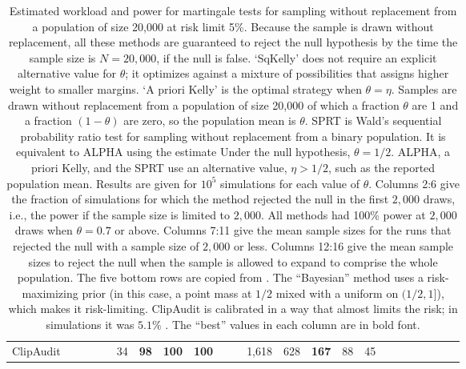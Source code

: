\documentclass[12pt,runningheads]{llncs}
\begin{document}
{\begin{table}
\begin{tabular}{llr|rrrrrr|rrrrrrr|rrrrrrr}
ClipAudit &  & &&& 34 & \bf{98} & \bf{100} &\bf{100}&&& 1,618 & 628 & \bf{167} & 88 & 45 
\end{tabular} 
\caption{\protect \label{tab:finite-population}
Estimated workload and power for martingale tests for sampling without replacement from a population of size 20,000 at
risk limit 5\%.
Because the sample is drawn without replacement, all these methods are guaranteed to reject the null hypothesis by the time
the sample size is $N=20,000$, if the null is false.
`SqKelly' does not require an explicit alternative value for $\theta$; it optimizes against a mixture of possibilities that assigns higher weight
to smaller margins.
`A priori Kelly' is the optimal strategy when $\theta = \eta$.
Samples are drawn without replacement from a population of size 20,000 of which a fraction $\theta$ are 1 and a fraction $(1-\theta)$
are zero, so the population mean is $\theta$.
SPRT is Wald's sequential probability ratio test for sampling without replacement from a binary population. 
It is equivalent to ALPHA using the estimate 
Under the null hypothesis, $\theta=1/2$. 
ALPHA, a priori Kelly, and the SPRT use an alternative value, $\eta > 1/2$, such as the reported population mean. 
Results are given for $10^5$ simulations for each value of $\theta$.
Columns 2:6 give the fraction of simulations for which the method rejected the null in the first $2,000$ draws, i.e., the power if the sample size is limited to $2,000$.
All methods had 100\% power at $2,000$ draws when $\theta=0.7$ or above.
Columns 7:11 give the mean sample sizes for the runs that rejected the null with a sample size of $2,000$ or less.
Columns 12:16 give the mean sample sizes to reject the null when the sample is allowed to
expand to comprise the whole population.
The five bottom rows are copied from \cite{huangEtal20}.
The ``Bayesian'' method uses a risk-maximizing prior \cite{vora19} (in this case, a point mass at $1/2$ mixed with a uniform on $(1/2, 1]$), which makes it risk-limiting.
ClipAudit \cite{rivest17} is calibrated in a way that almost limits the risk; in simulations it was $5.1\%$ \cite{huangEtal20}.
The ``best'' values in each column are in bold font.
}
\end{table}

}
\end{document}
